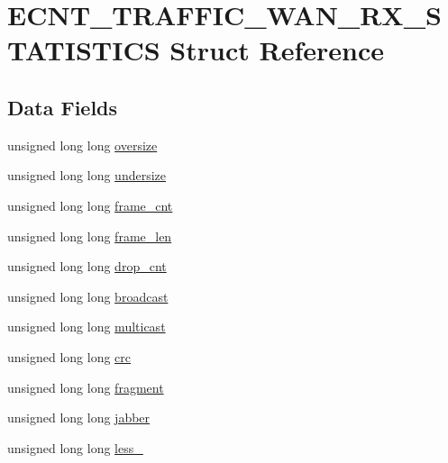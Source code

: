 \hypertarget{structECNT__TRAFFIC__WAN__RX__STATISTICS}{}\section{E\+C\+N\+T\+\_\+\+T\+R\+A\+F\+F\+I\+C\+\_\+\+W\+A\+N\+\_\+\+R\+X\+\_\+\+S\+T\+A\+T\+I\+S\+T\+I\+CS Struct Reference}
\label{structECNT__TRAFFIC__WAN__RX__STATISTICS}
\subsection*{Data Fields}
\begin{DoxyCompactItemize}
\item 
unsigned long long \hyperlink{structECNT__TRAFFIC__WAN__RX__STATISTICS_ada741c6874151673af03c7eb8d525f00}{oversize}
\item 
unsigned long long \hyperlink{structECNT__TRAFFIC__WAN__RX__STATISTICS_a0fe2ee11f096fcff267fefecb17506b5}{undersize}
\item 
unsigned long long \hyperlink{structECNT__TRAFFIC__WAN__RX__STATISTICS_a6f729c832aff5cc824799ed1a9868c6f}{frame\+\_\+cnt}
\item 
unsigned long long \hyperlink{structECNT__TRAFFIC__WAN__RX__STATISTICS_adc36c8c3a68b8dd33311f2d40b290219}{frame\+\_\+len}
\item 
unsigned long long \hyperlink{structECNT__TRAFFIC__WAN__RX__STATISTICS_ad88b97f84d132bdce0eff2fa21297aed}{drop\+\_\+cnt}
\item 
unsigned long long \hyperlink{structECNT__TRAFFIC__WAN__RX__STATISTICS_a08f0aaae8ef5545933ef90dedcbe93eb}{broadcast}
\item 
unsigned long long \hyperlink{structECNT__TRAFFIC__WAN__RX__STATISTICS_af67a546a5804b40ceed743248a1380cc}{multicast}
\item 
unsigned long long \hyperlink{structECNT__TRAFFIC__WAN__RX__STATISTICS_a055cf9098d3c40ca10afcfa683bde9b0}{crc}
\item 
unsigned long long \hyperlink{structECNT__TRAFFIC__WAN__RX__STATISTICS_a2305c6d29f7e0b784ea49a848dc68d55}{fragment}
\item 
unsigned long long \hyperlink{structECNT__TRAFFIC__WAN__RX__STATISTICS_ace801db82728781ef3524a64249472b0}{jabber}
\item 
unsigned long long \hyperlink{structECNT__TRAFFIC__WAN__RX__STATISTICS_a9701b5b486d860550bb8a924da9d3789}{less\+\_}

\end{DoxyCompactItemize}
